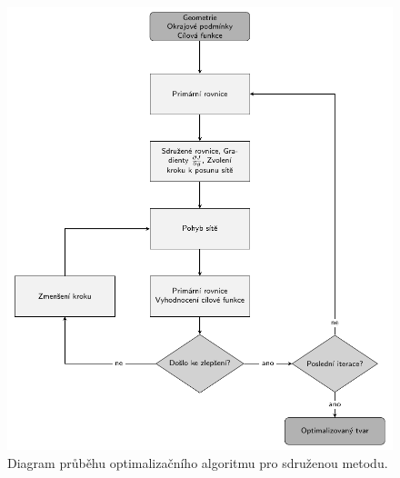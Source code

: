 \begin{figure}
\includegraphics[width=1\textwidth]{./img/flowchart/optimalizacni_cyklus.pdf}
\caption[Optimalizační cyklus]{Diagram průběhu optimalizačního algoritmu pro sdruženou metodu.}
\label{fig:flowchart_opt_cyklus}
\end{figure}

